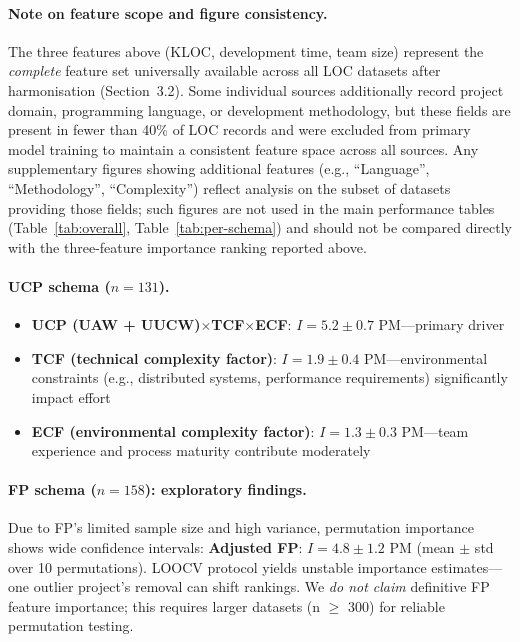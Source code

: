 \documentclass{ieeeaccess}
\begin{document}
\paragraph{Note on feature scope and figure consistency.}
The three features above (KLOC, development time, team size) represent the \emph{complete} feature set universally available across all LOC datasets after harmonisation (Section~3.2). Some individual sources additionally record project domain, programming language, or development methodology, but these fields are present in fewer than 40\% of LOC records and were excluded from primary model training to maintain a consistent feature space across all sources. Any supplementary figures showing additional features (e.g., ``Language'', ``Methodology'', ``Complexity'') reflect analysis on the subset of datasets providing those fields; such figures are not used in the main performance tables (Table~\ref{tab:overall}, Table~\ref{tab:per-schema}) and should not be compared directly with the three-feature importance ranking reported above.

\paragraph{UCP schema ($n{=}131$).}
\begin{itemize}[leftmargin=1.5em]
  \item \textbf{UCP (UAW + UUCW)$\times$TCF$\times$ECF}: $I = 5.2 \pm 0.7$ PM---primary driver
  \item \textbf{TCF (technical complexity factor)}: $I = 1.9 \pm 0.4$ PM---environmental constraints (e.g., distributed systems, performance requirements) significantly impact effort
  \item \textbf{ECF (environmental complexity factor)}: $I = 1.3 \pm 0.3$ PM---team experience and process maturity contribute moderately
\end{itemize}

\paragraph{FP schema ($n{=}158$): exploratory findings.}
Due to FP's limited sample size and high variance, permutation importance shows wide confidence intervals: \textbf{Adjusted FP}: $I = 4.8 \pm 1.2$ PM (mean $\pm$ std over 10 permutations). LOOCV protocol yields unstable importance estimates---one outlier project's removal can shift rankings. We \textit{do not claim} definitive FP feature importance; this requires larger datasets (n $\ge$ 300) for reliable permutation testing.
\end{document}
